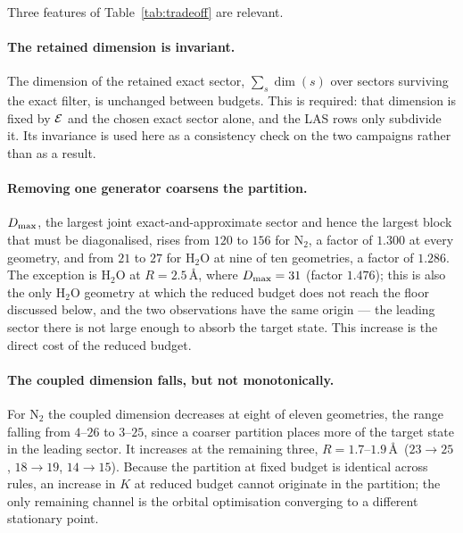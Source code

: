 \begin{table}[htbp]
\centering

\caption{Effect of reducing the budget by one generator, at the exhaustive rule
with the NC cost. $\Dmax$ is the largest joint exact-and-approximate sector;
``retained dim'' is the total dimension of the sectors surviving the exact
filter; the $K$ range is over the geometries of the scan. Where two values of
$\Dmax$ appear, they occur at different geometries.}
\label{tab:tradeoff}
\end{table}

Three features of Table~\ref{tab:tradeoff} are relevant.

\paragraph{The retained dimension is invariant.}
The dimension of the retained exact sector, $\sum_{s}\dim(s)$ over sectors
surviving the exact filter, is unchanged between budgets. This is required:
that dimension is fixed by $\mathcal E$ and the chosen exact sector alone, and the
LAS rows only subdivide it. Its invariance is used here as a consistency check
on the two campaigns rather than as a result.

\paragraph{Removing one generator coarsens the partition.}
\begin{sloppypar}
$\Dmax$, the largest joint exact-and-approximate sector and hence the largest
block that must be diagonalised, rises from $120$ to $156$ for $\mathrm{N_2}$, a
factor of $1.300$ at every geometry, and from $21$ to $27$ for $\mathrm{H_2O}$ at nine
of ten geometries, a factor of $1.286$. The exception is $\mathrm{H_2O}$ at
$R=2.5$\,\AA, where $D_{\max}=31$ (factor $1.476$); this is also the only $\mathrm{H_2O}$
geometry at which the reduced budget does not reach the floor discussed below,
and the two observations have the same origin --- the leading sector there is
not large enough to absorb the target state. This increase is the direct cost
of the reduced budget.
\end{sloppypar}

\paragraph{The coupled dimension falls, but not monotonically.}
For $\mathrm{N_2}$ the coupled dimension decreases at eight of eleven geometries, the
range falling from $4$--$26$ to $3$--$25$, since a coarser partition places more
of the target state in the leading sector. It increases at the remaining three,
$R=1.7$--$1.9$\,\AA\ ($23\to25$, $18\to19$, $14\to15$). Because the partition at
fixed budget is identical across rules, an increase in $K$ at reduced budget
cannot originate in the partition; the only remaining channel is the orbital
optimisation converging to a different stationary point.


